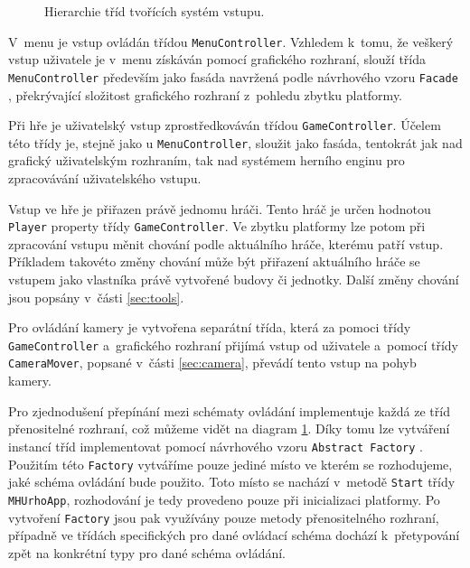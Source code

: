 \begin{figure}[h]
	\centering
	\fontsize{7pt}{10pt}\selectfont
	\def\svgwidth{\textwidth}
	
	\caption{Hierarchie tříd tvořících systém vstupu.}
	\label{fig:inputhier}
\end{figure}


V~menu je vstup ovládán třídou \texttt{MenuController}. Vzhledem k~tomu, že veškerý vstup uživatele je v~menu získáván pomocí grafického rozhraní, slouží třída \texttt{MenuController} především jako fasáda navržená podle návrhového vzoru \texttt{Facade} \citep[str.~185]{book:gangoffour}, překrývající složitost grafického rozhraní z~pohledu zbytku platformy. 

Při hře je uživatelský vstup zprostředkováván třídou \texttt{GameController}. Účelem této třídy je, stejně jako u \texttt{MenuController}, sloužit jako fasáda, tentokrát jak nad grafický uživatelským rozhraním, tak nad systémem herního enginu pro zpracovávání uživatelského vstupu. 

Vstup ve hře je přiřazen právě jednomu hráči. Tento hráč je určen hodnotou \texttt{Player} property třídy \texttt{GameController}. Ve zbytku platformy lze potom při zpracování vstupu měnit chování podle aktuálního hráče, kterému patří vstup. Příkladem takovéto změny chování může být přiřazení aktuálního hráče se vstupem jako vlastníka právě vytvořené budovy či jednotky. Další změny chování jsou popsány v~části \ref{sec:tools}.

Pro ovládání kamery je vytvořena separátní třída, která za pomoci třídy \texttt{GameController} a~grafického rozhraní přijímá vstup od uživatele a~pomocí třídy \texttt{CameraMover},  popsané v~části \ref{sec:camera}, převádí tento vstup na pohyb kamery.

Pro zjednodušení přepínání mezi schématy ovládání implementuje každá ze tříd přenositelné rozhraní, což můžeme vidět na diagram \ref{fig:inputhier}. Díky tomu lze vytváření instancí tříd implementovat pomocí návrhového vzoru \texttt{Abstract Factory} \citep[str.~87]{book:gangoffour}. Použitím této \texttt{Factory} vytváříme pouze jediné místo ve kterém se rozhodujeme, jaké schéma ovládání bude použito. Toto místo se nachází v~metodě \texttt{Start} třídy \texttt{MHUrhoApp}, rozhodování je tedy provedeno pouze při inicializaci platformy. Po vytvoření \texttt{Factory} jsou pak využívány pouze metody přenositelného rozhraní, případně ve třídách specifických pro dané ovládací schéma dochází k~přetypování zpět na konkrétní typy pro dané schéma ovládání.

